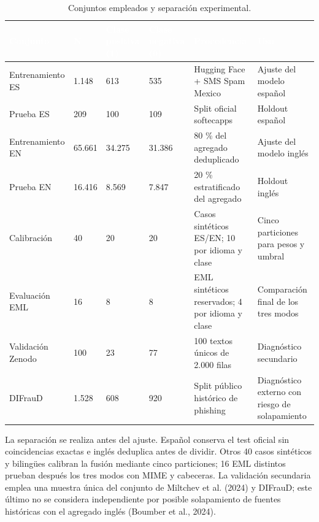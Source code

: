 \documentclass[11pt,a4paper,oneside]{report}
\begin{document}
\begingroup
\begin{table}[H]
  \centering
  \small
  \caption{Conjuntos empleados y separación experimental.}
  \label{tab:6-1}
  \begin{tabularx}{\textwidth}{|X|X|X|X|X|X|}
    \hline
    \rowcolor{uemcgreen}
    \textcolor{white}{\textbf{Conjunto}} & \textcolor{white}{\textbf{N}} & \textcolor{white}{\textbf{Clase positiva (1)}} & \textcolor{white}{\textbf{Clase negativa (0)}} & \textcolor{white}{\textbf{Procedencia}} & \textcolor{white}{\textbf{Uso}} \\
    \hline
    Entrena\-miento ES & 1.148 & 613 & 535 & Hugging Face + SMS Spam Mexico & Ajuste del modelo español \\
    \hline
    \rowcolor{tablelight}
    Prueba ES & 209 & 100 & 109 & Split oficial softecapps & Holdout español \\
    \hline
    Entrena\-miento EN & 65.661 & 34.275 & 31.386 & 80 \% del agregado deduplicado & Ajuste del modelo inglés \\
    \hline
    \rowcolor{tablelight}
    Prueba EN & 16.416 & 8.569 & 7.847 & 20 \% estratificado del agregado & Holdout inglés \\
    \hline
    Calibración & 40 & 20 & 20 & Casos sintéticos ES/EN; 10 por idioma y clase & Cinco particiones para pesos y umbral \\
    \hline
    \rowcolor{tablelight}
    Evaluación EML & 16 & 8 & 8 & EML sintéticos reservados; 4 por idioma y clase & Comparación final de los tres modos \\
    \hline
    Validación Zenodo & 100 & 23 & 77 & 100 textos únicos de 2.000 filas & Diagnóstico secundario \\
    \hline
    \rowcolor{tablelight}
    DIFrauD & 1.528 & 608 & 920 & Split público histórico de phishing & Diagnóstico externo con riesgo de solapamiento \\
    \hline
  \end{tabularx}
\end{table}
\endgroup

La separación se realiza antes del ajuste. Español conserva el test oficial sin coincidencias exactas e inglés deduplica antes de dividir. Otros 40 casos sintéticos y bilingües calibran la fusión mediante cinco particiones; 16 EML distintos prueban después los tres modos con MIME y cabeceras. La validación secundaria emplea una muestra única del conjunto de Miltchev et al. (2024) y DIFrauD; este último no se considera independiente por posible solapamiento de fuentes históricas con el agregado inglés (Boumber et al., 2024).
\end{document}
